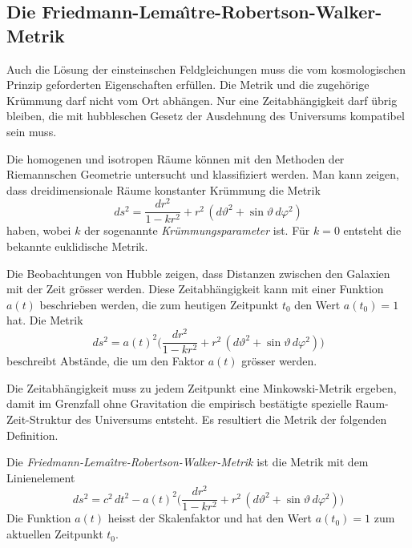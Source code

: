 %
%
\subsection{Die Friedmann-Lema\^\i tre-Robertson-Walker-Metrik}
Auch die Lösung der einsteinschen Feldgleichungen muss die vom
kosmologischen Prinzip geforderten Eigenschaften erfüllen.
Die Metrik und die zugehörige Krümmung darf nicht vom Ort
abhängen.
Nur eine Zeitabhängigkeit darf übrig bleiben, die mit hubbleschen
Gesetz der Ausdehnung des Universums kompatibel sein muss.

Die homogenen und isotropen Räume können mit den Methoden der
Riemannschen Geometrie untersucht und klassifiziert werden.
Man kann zeigen, dass dreidimensionale Räume konstanter Krümmung 
die Metrik
\[
ds^2
=
\frac{dr^2}{1-kr^2} + r^2\,(d\vartheta^2 + \sin\vartheta\,d\varphi^2)
\]
haben, wobei $k$ der sogenannte \emph{Krümmungsparameter} ist.
Für $k=0$ entsteht die bekannte euklidische Metrik.

Die Beobachtungen von Hubble zeigen, dass Distanzen zwischen
den Galaxien mit der Zeit grösser werden.
Diese Zeitabhängigkeit kann mit einer Funktion $a(t)$ beschrieben
werden, die zum heutigen Zeitpunkt $t_0$ den Wert $a(t_0)=1$ hat.
Die Metrik
\begin{equation}
ds^2
=
a(t)^2
\biggl(
\frac{dr^2}{1-kr^2} + r^2\,(d\vartheta^2 + \sin\vartheta\,d\varphi^2)
\biggr)
\label{buch:kruemmung:kosmologie:eqn:ads}
\end{equation}
beschreibt Abstände, die um den Faktor $a(t)$ grösser werden.

Die Zeitabhängigkeit muss zu jedem Zeitpunkt eine Minkowski-Metrik
ergeben, damit im Grenzfall ohne Gravitation die empirisch bestätigte
spezielle Raum-Zeit-Struktur des Universums entsteht.
Es resultiert die Metrik der folgenden Definition.

\begin{definition}
Die \emph{Friedmann-Le\-ma\^\i tre-Robertson-Walker-Metrik} ist die Metrik
%
mit dem Linienelement
\begin{equation}
ds^2
=
c^2\,dt^2
-
a(t)^2\biggl(
\frac{dr^2}{1-kr^2} + r^2\,(d\vartheta^2 + \sin\vartheta\,d\varphi^2)
\biggr)
\end{equation}
Die Funktion $a(t)$ heisst der Skalenfaktor und hat den Wert $a(t_0)=1$
zum aktuellen Zeitpunkt $t_0$.
%
\end{definition}

